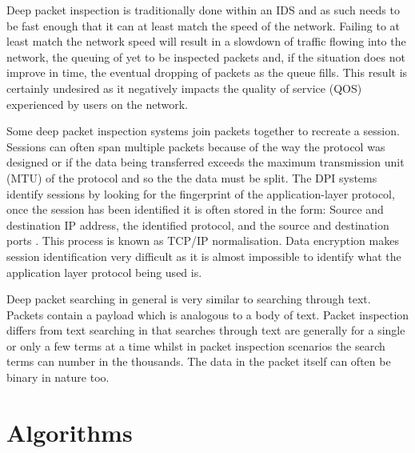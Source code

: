 \documentclass{article}
\begin{document}
Deep packet inspection is traditionally done within an IDS and as such needs to be fast enough that it can at least match the speed of the network. Failing to at least match the network speed will result in a slowdown of traffic flowing into the network, the queuing of yet to be inspected packets and, if the situation does not improve in time, the eventual dropping of packets as the queue fills. This result is certainly undesired as it negatively impacts the quality of service (QOS) experienced by users on the network.

Some deep packet inspection systems join packets together to recreate a session. Sessions can often span multiple packets because of the way the protocol was designed or if the data being transferred exceeds the maximum transmission unit (MTU) of the protocol and so the the data must be split. The DPI systems identify sessions by looking for the fingerprint of the application-layer protocol, once the session has been identified it is often stored in the form: Source and destination IP address, the identified protocol, and the source and destination ports \citep{Cascarano2011}. This process is known as TCP/IP normalisation. Data encryption makes session identification very difficult as it is almost impossible to identify what the application layer protocol being used is.

Deep packet searching in general is very similar to searching through text. Packets contain a payload which is analogous to a body of text. Packet inspection differs from text searching in that searches through text are generally for a single or only a few terms at a time whilst in packet inspection scenarios the search terms can number in the thousands. The data in the packet itself can often be binary in nature too.

\section{Algorithms} \label{algorithms}
\end{document}
